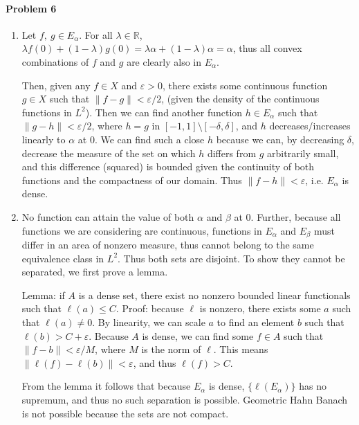 \documentclass[12pt]{article}
\begin{document}
\paragraph{Problem 6}
\begin{enumerate}[label=(\alph*)]
\item 
  Let $f,\ g \in E_\alpha$. For all $\lambda \in \mathbb{R}$, $\lambda f(0) +
  (1-\lambda)g(0) = \lambda \alpha + (1-\lambda) \alpha = \alpha$, thus all
  convex combinations of $f$ and $g$ are clearly also in $E_\alpha$.

  Then, given
  any $f \in X$ and $\varepsilon > 0$, there exists some continuous function
  $g \in X$ such that $\|f - g\| < \varepsilon/2$, (given the density of the
  continuous functions in $L^2$). Then we can find another function $h \in E_\alpha
  $ such that $\|g-h\| < \varepsilon/2$, where $h = g$ in $[-1,1]\setminus [-\delta
  ,\delta]$, and $h$ decreases/increases linearly to $\alpha$ at $0$. We can find
  such a close $h$ because we can, by decreasing $\delta$, decrease the measure
  of the set on which $h$ differs from $g$ arbitrarily small, and this difference
  (squared) is bounded given the continuity of both functions and the compactness
  of our domain. Thus $\|f-h\| < \varepsilon$, i.e. $E_\alpha$ is dense.
\item No function can attain the value of both $\alpha$ and $\beta$ at 0. Further,
  because all functions we are considering are continuous, functions in $E_\alpha$
  and $E_\beta$ must differ in an area of nonzero measure, thus cannot belong to
  the same equivalence class in $L^2$. Thus both sets are disjoint. To show they
  cannot be separated, we first prove a lemma.

  Lemma: if $A$ is a dense set, there exist no nonzero bounded linear functionals
  such that $\ell(a) \leq C$. Proof: because $\ell$ is nonzero, there exists some
  $a$ such that $\ell(a) \neq 0$. By linearity, we can scale $a$ to find an element
  $b$ such that $\ell(b) > C + \varepsilon$. Because $A$ is dense, we can find some
  $f\in A$ such that $\|f - b\| < \varepsilon/M$, where $M$ is the norm of $\ell$.
  This means $\|\ell(f) - \ell(b)\| < \varepsilon$, and thus $\ell(f) > C$.

  From the lemma it follows that because $E_\alpha$ is dense, $\{\ell(E_\alpha)\}$
  has no supremum, and thus no such separation is possible. Geometric Hahn Banach
  is not possible because the sets are not compact.
  
\end{enumerate}
\end{document}
